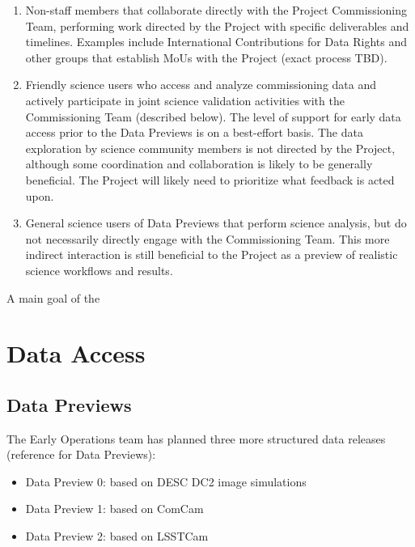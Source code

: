 \documentclass[SE,authoryear,toc]{lsstdoc}
\begin{document}
\begin{enumerate}

\item Non-staff members that collaborate directly with the Project Commissioning Team, performing work directed by the Project with specific deliverables and timelines. 
Examples include International Contributions for Data Rights and other groups that establish MoUs with the Project (exact process TBD).

\item Friendly science users who access and analyze commissioning data and actively participate in joint science validation activities with the Commissioning Team (described below). 
The level of support for early data access prior to the Data Previews is on a best-effort basis.
The data exploration by science community members is not directed by the Project, although some coordination and collaboration is likely to be generally beneficial.
The Project will likely need to prioritize what feedback is acted upon.

\item General science users of Data Previews that perform science analysis, but do not necessarily directly engage with the Commissioning Team. 
This more indirect interaction is still beneficial to the Project as a preview of realistic science workflows and results.

\end{enumerate}

A main goal of the 

\section{Data Access}

\subsection{Data Previews}

The Early Operations team has planned three more structured data releases (reference for Data Previews):

\begin{itemize}
\item Data Preview 0: based on DESC DC2 image simulations
\item Data Preview 1: based on ComCam
\item Data Preview 2: based on LSSTCam
\end{itemize}
\end{document}
